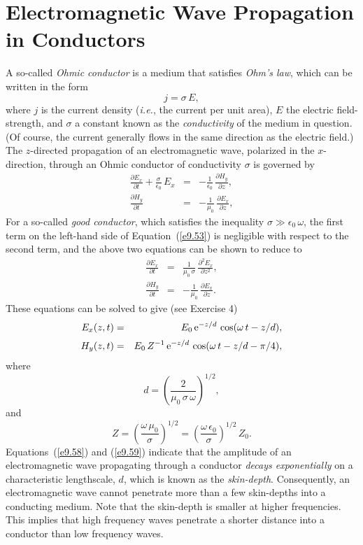 \section{Electromagnetic Wave Propagation in Conductors}\label{s9.3}
A so-called {\em Ohmic conductor}\/ is a medium that satisfies {\em Ohm's law}, which can be
written in the form
\begin{equation}
j = \sigma\,E,
\end{equation}
where $j$ is the current density ({\em i.e.}, the current per unit area), $E$ the
electric field-strength, and $\sigma$ a constant known as the {\em conductivity}\/
of the medium in question. (Of course, the current generally flows in the same direction as the
electric field.)
The $z$-directed propagation of an electromagnetic
wave, polarized in the $x$-direction, through an Ohmic conductor of conductivity $\sigma$ is
governed by
\begin{eqnarray}\label{e9.53}
\frac{\partial E_x}{\partial t} +\frac{\sigma}{\epsilon_0}\,E_x &=&-\frac{1}{\epsilon_0}\, \frac{\partial H_y}{\partial z},\\[0.5ex]
\frac{\partial H_y}{\partial t} &=&-\frac{1}{\mu_0}\,\frac{\partial E_x}{\partial z},
\end{eqnarray}
For a so-called {\em good conductor}, which satisfies the inequality $\sigma\gg \epsilon_0\,\omega$, the first term on the 
left-hand side of Equation~(\ref{e9.53}) is negligible with respect to the
second term, and the above two equations can be shown to reduce to
\begin{eqnarray}\label{e9.56}
\frac{\partial E_x}{\partial t} &=&\frac{1}{\mu_0\,\sigma}\,\frac{\partial^2 E_x}{\partial z^2},\\[0.5ex]
\frac{\partial H_y}{\partial t} &=& -\frac{1}{\mu_0}\,\frac{\partial E_x}{\partial z}.\label{e9.57}
\end{eqnarray}
These equations can be solved to give (see Exercise 4)
\begin{eqnarray}\label{e9.58}
E_x(z,t) &=& E_0\,{\rm e}^{-z/d}\,\cos(\omega\,t-z/d),\\[0.5ex]
H_y(z,t) &=& E_0\,Z^{-1}\,{\rm e}^{-z/d}\,\cos(\omega\,t-z/d-\pi/4),\label{e9.59}
\end{eqnarray}
where 
\begin{equation}
d = \left(\frac{2}{\mu_0\,\sigma\,\omega}\right)^{1/2},
\end{equation}
and
\begin{equation}\label{e9.61}
Z = \left(\frac{\omega\,\mu_0}{\sigma}\right)^{1/2} = \left(\frac{\omega\,\epsilon_0}{\sigma}\right)^{1/2}\,Z_0.
\end{equation}
Equations~(\ref{e9.58}) and (\ref{e9.59}) indicate that the amplitude of an electromagnetic
wave propagating through a conductor {\em decays exponentially}\/ on a characteristic lengthscale,
$d$, which is known as the {\em skin-depth}. Consequently, an electromagnetic wave
cannot penetrate more than a few skin-depths into a conducting medium. Note that the skin-depth
is smaller at higher frequencies. This implies that high frequency waves penetrate
a shorter distance into a conductor than low frequency waves.

